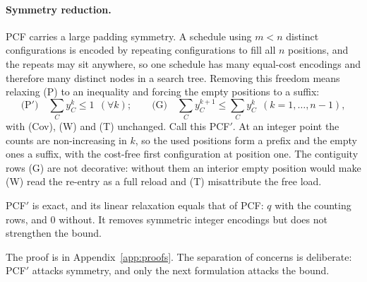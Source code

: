 \paragraph{Symmetry reduction.}
PCF carries a large padding symmetry. A schedule using $m<n$ distinct configurations
is encoded by repeating configurations to fill all $n$ positions, and the repeats may
sit anywhere, so one schedule has many equal-cost encodings and therefore many
distinct nodes in a search tree. Removing this freedom means relaxing (P) to an
inequality and forcing the empty positions to a suffix:
\[
  \text{(P$'$)}\quad \sum_{C} y_C^{k}\le1\ \ (\forall k);
  \qquad
  \text{(G)}\quad \sum_{C} y_C^{k+1}\le\sum_{C} y_C^{k}\ \ (k=1,\dots,n-1),
\]
with (Cov), (W) and (T) unchanged. Call this PCF$'$. At an integer point the counts
are non-increasing in $k$, so the used positions form a prefix and the empty ones a
suffix, with the cost-free first configuration at position one. The contiguity rows
(G) are not decorative: without them an interior empty position would make (W) read
the re-entry as a full reload and (T) misattribute the free load.

\begin{proposition}\label{prop:pcfprime}
PCF$'$ is exact, and its linear relaxation equals that of PCF: $q$ with the counting
rows, and $0$ without. It removes symmetric integer encodings but does not strengthen
the bound.
\end{proposition}

The proof is in Appendix~\ref{app:proofs}. The separation of concerns is deliberate:
PCF$'$ attacks symmetry, and only the next formulation attacks the bound.

